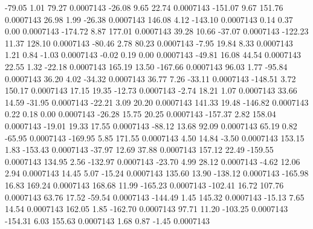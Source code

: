      -79.05        1.01       79.27     0.0007143
      -26.08        9.65       22.74     0.0007143
     -151.07        9.67      151.76     0.0007143
       26.98        1.99      -26.38     0.0007143
      146.08        4.12     -143.10     0.0007143
        0.14        0.37        0.00     0.0007143
     -174.72        8.87      177.01     0.0007143
       39.28       10.66      -37.07     0.0007143
     -122.23       11.37      128.10     0.0007143
      -80.46        2.78       80.23     0.0007143
       -7.95       19.84        8.33     0.0007143
        1.21        0.84       -1.03     0.0007143
       -0.02        0.19        0.00     0.0007143
      -49.81       16.08       44.54     0.0007143
       22.55        1.32      -22.18     0.0007143
      165.19       13.50     -167.66     0.0007143
       96.03        1.77      -95.84     0.0007143
       36.20        4.02      -34.32     0.0007143
       36.77        7.26      -33.11     0.0007143
     -148.51        3.72      150.17     0.0007143
       17.15       19.35      -12.73     0.0007143
       -2.74       18.21        1.07     0.0007143
       33.66       14.59      -31.95     0.0007143
      -22.21        3.09       20.20     0.0007143
      141.33       19.48     -146.82     0.0007143
        0.22        0.18        0.00     0.0007143
      -26.28       15.75       20.25     0.0007143
     -157.37        2.82      158.04     0.0007143
      -19.01       19.33       17.55     0.0007143
      -88.12       13.68       92.09     0.0007143
       65.19        0.82      -65.95     0.0007143
     -169.95        5.85      171.55     0.0007143
        4.50       14.84       -3.50     0.0007143
      153.15        1.83     -153.43     0.0007143
      -37.97       12.69       37.88     0.0007143
      157.12       22.49     -159.55     0.0007143
      134.95        2.56     -132.97     0.0007143
      -23.70        4.99       28.12     0.0007143
       -4.62       12.06        2.94     0.0007143
       14.45        5.07      -15.24     0.0007143
      135.60       13.90     -138.12     0.0007143
     -165.98       16.83      169.24     0.0007143
      168.68       11.99     -165.23     0.0007143
     -102.41       16.72      107.76     0.0007143
       63.76       17.52      -59.54     0.0007143
     -144.49        1.45      145.32     0.0007143
      -15.13        7.65       14.54     0.0007143
      162.05        1.85     -162.70     0.0007143
       97.71       11.20     -103.25     0.0007143
     -154.31        6.03      155.63     0.0007143
        1.68        0.87       -1.45     0.0007143
